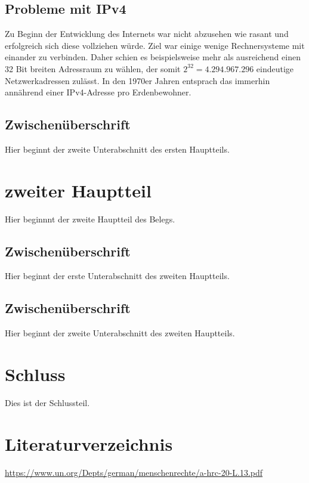 \documentclass[a4paper,12pt]{scrartcl}
\begin{document}
\subsection{Probleme mit IPv4}
Zu Beginn der Entwicklung des Internets war nicht abzusehen wie rasant und erfolgreich sich diese vollziehen würde. Ziel war einige wenige Rechnersysteme mit einander zu verbinden. Daher schien es beispielsweise mehr als ausreichend einen 32 Bit breiten Adressraum zu wählen, der somit $2^{32} = 4.294.967.296$ eindeutige Netzwerkadressen zulässt. In den 1970er Jahren entsprach das immerhin annährend einer IPv4-Adresse pro Erdenbewohner. 
 
\subsection{Zwischenüberschrift}
Hier beginnt der zweite Unterabschnitt des ersten Hauptteils.
 
\section{zweiter Hauptteil}
Hier beginnnt der zweite Hauptteil des Belegs.
 
\subsection{Zwischenüberschrift}
Hier beginnt der erste Unterabschnitt des zweiten Hauptteils.
 
\subsection{Zwischenüberschrift}
Hier beginnt der zweite Unterabschnitt des zweiten Hauptteils.
 
\section{Schluss}
Dies ist der Schlussteil.
\clearpage
 
\section{Literaturverzeichnis}

\begin{thebibliography}{50}

    \url{https://www.un.org/Depts/german/menschenrechte/a-hrc-20-L.13.pdf}

\end{thebibliography}
 
 
\end{document}
